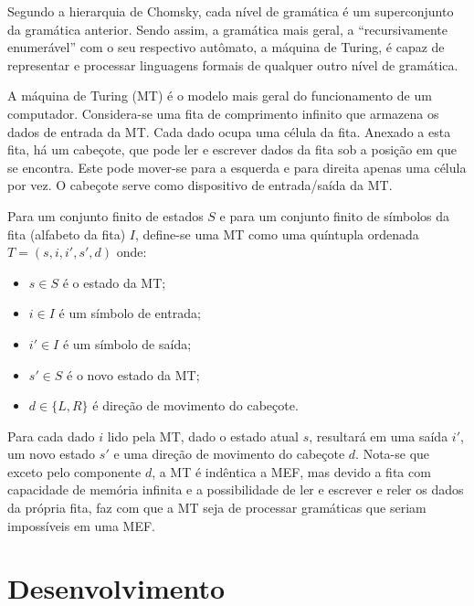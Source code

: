 Segundo a hierarquia de Chomsky, cada nível de gramática é um superconjunto da
gramática anterior. Sendo assim, a gramática mais geral, a ``recursivamente
enumerável'' com o seu respectivo autômato, a máquina de Turing, é capaz de
representar e processar linguagens formais de qualquer outro nível de gramática.

A máquina de Turing (MT) é o modelo mais geral do funcionamento de um
computador. Considera-se uma fita de comprimento infinito que armazena os dados
de entrada da MT. Cada dado ocupa uma célula da fita. Anexado a esta fita, há
um cabeçote, que pode ler e escrever dados da fita sob a posição em que se
encontra. Este pode mover-se para a esquerda e para direita apenas uma célula
por vez. O cabeçote serve como dispositivo de entrada/saída da MT.

Para um conjunto finito de estados $S$ e para um conjunto finito de
símbolos da fita (alfabeto da fita) $I$, define-se uma MT como uma quíntupla
ordenada $T = (s, i, i', s', d)$ onde:
\begin{itemize}
    \item $s \in S$ é o estado da MT;
    \item $i \in I$ é um símbolo de entrada;
    \item $i' \in I$ é um símbolo de saída;
    \item $s' \in S$ é o novo estado da MT;
    \item $d \in \{L,R\}$ é direção de movimento do cabeçote.
\end{itemize}

Para cada dado $i$ lido pela MT, dado o estado atual $s$, resultará em uma
saída $i'$, um novo estado $s'$ e uma direção de movimento do cabeçote $d$.
Nota-se que exceto pelo componente $d$, a MT é indêntica a MEF, mas devido a
fita com capacidade de memória infinita e a possibilidade de ler e escrever e
reler os dados da própria fita, faz com que a MT seja de processar gramáticas
que seriam impossíveis em uma MEF.

\section{Desenvolvimento}

